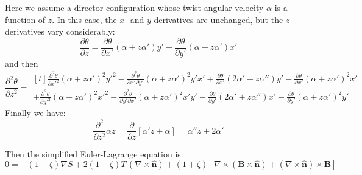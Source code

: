 \documentclass[reqno]{article}
\newcommand{\n}{\hat{\mathbf{n}}}
\begin{document}
Here we assume a director configuration whose twist angular velocity $\alpha$ is a function of $z$.
In this case, the $x$- and $y$-derivatives are unchanged, but the $z$ derivatives vary considerably:
\begin{equation}
    \frac{\partial \theta}{\partial z}
    =
    \frac{\partial \theta}{\partial x'} (\alpha + z\alpha') y'
    -
    \frac{\partial \theta}{\partial y'} (\alpha + z \alpha') x'
\end{equation}
and then
\begin{equation}
    \frac{\partial^2 \theta}{\partial z^2}
    =
    \begin{multlined}[t]
        \frac{\partial^2 \theta}{\partial x'^2} (\alpha + z\alpha')^2 y'^2
        -
        \frac{\partial^2 \theta}{\partial x' \partial y'} (\alpha + z\alpha')^2 y' x'
        +
        \frac{\partial \theta}{\partial x'} (2 \alpha' + z \alpha'') y'
        -
        \frac{\partial \theta}{\partial x'} (\alpha + z\alpha')^2 x' \\
        +
        \frac{\partial^2 \theta}{\partial y'^2} (\alpha + z \alpha')^2 x'^2
        -
        \frac{\partial^2 \theta}{\partial y' \partial x'} (\alpha + z \alpha')^2 x' y'
        -
        \frac{\partial \theta}{\partial y'} (2 \alpha' + z \alpha'') x'
        -
        \frac{\partial \theta}{\partial y'} (\alpha + z \alpha')^2 y'
    \end{multlined}
\end{equation}
Finally we have:
\begin{equation}
    \frac{\partial^2}{\partial z^2} \alpha z
    =
    \frac{\partial}{\partial z} \left[
        \alpha' z + \alpha
    \right]
    =
    \alpha'' z + 2 \alpha'
\end{equation}

\theendnotes

Then the simplified Euler-Lagrange equation is:
\begin{equation}
    0
    =
    -(1 + \zeta) \nabla S
    + 2 (1 - \zeta) T \, \left(\nabla \times \n\right)
    + (1 + \zeta) \left[ 
        \nabla \times \left( \mathbf{B} \times \n \right)
        + \left( \nabla \times \n \right) \times \mathbf{B}
    \right]
\end{equation}
\end{document}
